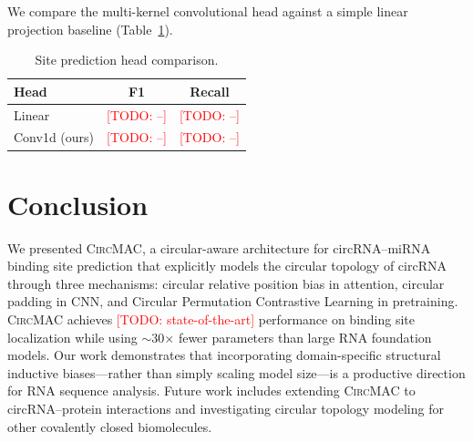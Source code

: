 \documentclass[10pt,twocolumn]{article}
\newcommand{\todo}[1]{\textcolor{red}{[TODO: #1]}}
\newcommand{\circmac}{\textsc{CircMAC}}
\begin{document}
We compare the multi-kernel convolutional head against a simple
linear projection baseline (Table~\ref{tab:sitehead}).

\begin{table}[h]
\centering
\caption{Site prediction head comparison.}
\label{tab:sitehead}
\begin{tabular}{lcc}
\toprule
\textbf{Head} & \textbf{F1} & \textbf{Recall} \\
\midrule
Linear          & \todo{--} & \todo{--} \\
Conv1d (ours)   & \todo{--} & \todo{--} \\
\bottomrule
\end{tabular}
\end{table}

\section{Conclusion}
\label{sec:conclusion}

We presented \circmac{}, a circular-aware architecture for
circRNA--miRNA binding site prediction that explicitly models the
circular topology of circRNA through three mechanisms: circular relative
position bias in attention, circular padding in CNN, and
Circular Permutation Contrastive Learning in pretraining.
\circmac{} achieves \todo{state-of-the-art} performance on binding site
localization while using $\sim$30$\times$ fewer parameters than large
RNA foundation models.
Our work demonstrates that incorporating domain-specific structural
inductive biases---rather than simply scaling model size---is a
productive direction for RNA sequence analysis.
Future work includes extending \circmac{} to circRNA--protein
interactions and investigating circular topology modeling for
other covalently closed biomolecules.
\end{document}
